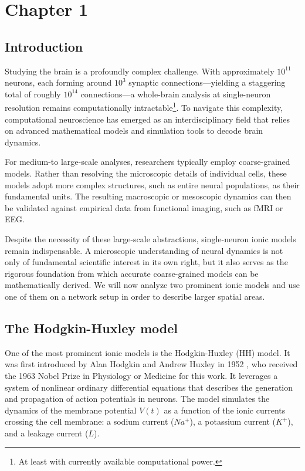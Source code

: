 \chapter{Chapter 1}
\label{Chp:1}

\section{Introduction}

Studying the brain is a profoundly complex challenge. With approximately $10^{11}$ neurons, each forming around $10^{3}$ synaptic connections---yielding a staggering total of roughly $10^{14}$ connections---a whole-brain analysis at single-neuron resolution remains computationally intractable\footnote{At least with currently available computational power.}. To navigate this complexity, computational neuroscience has emerged as an interdisciplinary field that relies on advanced mathematical models and simulation tools to decode brain dynamics.

For medium-to large-scale analyses, researchers typically employ coarse-grained models. Rather than resolving the microscopic details of individual cells, these models adopt more complex structures, such as entire neural populations, as their fundamental units. The resulting macroscopic or mesoscopic dynamics can then be validated against empirical data from functional imaging, such as fMRI or EEG.

Despite the necessity of these large-scale abstractions, single-neuron ionic models remain indispensable. A microscopic understanding of neural dynamics is not only of fundamental scientific interest in its own right, but it also serves as the rigorous foundation from which accurate coarse-grained models can be mathematically derived.
\newline
We will now analyze two prominent ionic models and use one of them on a network setup in order to describe larger spatial areas.


\section{The Hodgkin-Huxley model}
One of the most prominent ionic models is the Hodgkin-Huxley (HH) model. It was first introduced by Alan Hodgkin and Andrew Huxley in 1952 \cite{hodgkin1952quantitative}, who received the 1963 Nobel Prize in Physiology or Medicine for this work.
\newline
It leverages a system of nonlinear ordinary differential equations that describes the generation and propagation of action potentials in neurons. The model simulates the dynamics of the membrane potential $V(t)$ as a function of the ionic currents crossing the cell membrane: a sodium current ($Na^+$), a potassium current ($K^+$), and a leakage current ($L$).

